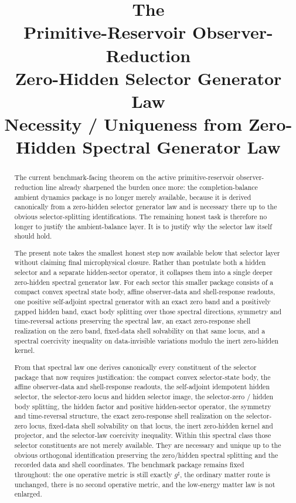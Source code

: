 \documentclass[11pt]{article}
\title{\textbf{The \TheoryName{}}\\[0.4em]
\large Primitive-Reservoir Observer-Reduction\\
\large Zero-Hidden Selector Generator Law\\
\large Necessity / Uniqueness from Zero-Hidden Spectral Generator Law}
\author{}
\date{}
\newcommand{\CompletedMetric}{g^{\sharp}}
\begin{document}
\maketitle

\begin{abstract}
The current benchmark-facing theorem on the active primitive-reservoir observer-reduction line already sharpened the burden once more: the completion-balance ambient dynamics package is no longer merely available, because it is derived canonically from a zero-hidden selector generator law and is necessary there up to the obvious selector-splitting identifications. The remaining honest task is therefore no longer to justify the ambient-balance layer. It is to justify why the selector law itself should hold.

The present note takes the smallest honest step now available below that selector layer without claiming final microphysical closure. Rather than postulate both a hidden selector and a separate hidden-sector operator, it collapses them into a single deeper zero-hidden spectral generator law. For each sector this smaller package consists of a compact convex spectral state body, affine observer-data and shell-response readouts, one positive self-adjoint spectral generator with an exact zero band and a positively gapped hidden band, exact body splitting over those spectral directions, symmetry and time-reversal actions preserving the spectral law, an exact zero-response shell realization on the zero band, fixed-data shell solvability on that same locus, and a spectral coercivity inequality on data-invisible variations modulo the inert zero-hidden kernel.

From that spectral law one derives canonically every constituent of the selector package that now requires justification: the compact convex selector-state body, the affine observer-data and shell-response readouts, the self-adjoint idempotent hidden selector, the selector-zero locus and hidden selector image, the selector-zero / hidden body splitting, the hidden factor and positive hidden-sector operator, the symmetry and time-reversal structure, the exact zero-response shell realization on the selector-zero locus, fixed-data shell solvability on that locus, the inert zero-hidden kernel and projector, and the selector-law coercivity inequality. Within this spectral class those selector constituents are not merely available. They are necessary and unique up to the obvious orthogonal identification preserving the zero/hidden spectral splitting and the recorded data and shell coordinates. The benchmark package remains fixed throughout: the one operative metric is still exactly \(\CompletedMetric\), the ordinary matter route is unchanged, there is no second operative metric, and the low-energy matter law is not enlarged.
\end{abstract}
\end{document}
